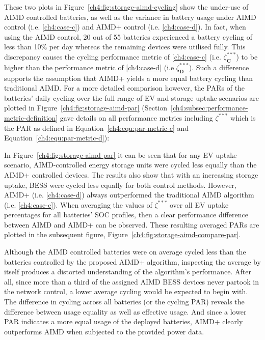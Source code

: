 

These two plots in Figure~\ref{ch4:fig:storage-aimd-cycling} show the under-use of AIMD controlled batteries, as well as the variance in battery usage under AIMD control (i.e. \ref{ch4:case-c}) and AIMD+ control (i.e. \ref{ch4:case-d}).
In fact, when using the AIMD control, 20 out of 55 batteries experienced a battery cycling of less than 10\% per day whereas the remaining devices were utilised fully.
This discrepancy causes the cycling performance metric of \ref{ch4:case-c} (i.e. $\zeta_\textbf{C}^{***}$) to be higher than the performance metric of \ref{ch4:case-d} (i.e $\zeta_\textbf{D}^{***}$).
Such a difference supports the assumption that AIMD+ yields a more equal battery cycling than traditional AIMD.
For a more detailed comparison however, the PARs of the batteries' daily cycling over the full range of EV and storage uptake scenarios are plotted in Figure~\ref{ch4:fig:storage-aimd-par} (Section~\ref{ch4:subsec:performance-metric-definition} gave details on all performance metrics including $\zeta^{***}$ which is the PAR as defined in Equation~\ref{ch4:equ:par-metric-c} and Equation~\ref{ch4:equ:par-metric-d}):



In Figure~\ref{ch4:fig:storage-aimd-par} it can be seen that for any EV uptake scenario, AIMD-controlled energy storage units were cycled less equally than the AIMD+ controlled devices.
The results also show that with an increasing storage uptake, BESS were cycled less equally for both control methods.
However, AIMD+ (i.e. \ref{ch4:case-d}) always outperformed the traditional AIMD algorithm (i.e. \ref{ch4:case-c}).
When averaging the values of $\zeta^{***}$ over all EV uptake percentages for all batteries' SOC profiles, then a clear performance difference between AIMD and AIMD+ can be observed.
These resulting averaged PARs are plotted in the subsequent figure, Figure~\ref{ch4:fig:storage-aimd-compare-par}.



Although the AIMD controlled batteries were on average cycled less than the batteries controlled by the proposed AIMD+ algorithm, inspecting the average by itself produces a distorted understanding of the algorithm's performance.
After all, since more than a third of the assigned AIMD BESS devices never partook in the network control, a lower average cycling would be expected to begin with.
The difference in cycling across all batteries (or the cycling PAR) reveals the difference between usage equality as well as effective usage.
And since a lower PAR indicates a more equal usage of the deployed batteries, AIMD+ clearly outperforms AIMD when subjected to the provided power data.
